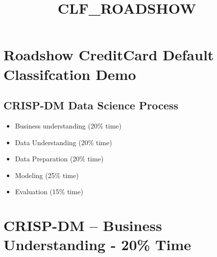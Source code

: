 \documentclass[11pt]{article}
\title{CLF\_ROADSHOW}
\providecommand{\tightlist}{%
      \setlength{\itemsep}{0pt}\setlength{\parskip}{0pt}}
\begin{document}
    
    
    \maketitle
    
    

    
    \hypertarget{roadshow-creditcard-default-classifcation-demo}{%
\section{Roadshow CreditCard Default Classifcation
Demo}\label{roadshow-creditcard-default-classifcation-demo}}

    \hypertarget{crisp-dm-data-science-process}{%
\subsection{CRISP-DM Data Science
Process}\label{crisp-dm-data-science-process}}

\begin{itemize}
\tightlist
\item
  Business understanding (20\% time)
\item
  Data Understanding (20\% time)
\item
  Data Preparation (20\% time)
\item
  Modeling (25\% time)
\item
  Evaluation (15\% time)
\end{itemize}

    \hypertarget{crisp-dm-business-understanding---20-time}{%
\section{CRISP-DM -- Business Understanding - 20\%
Time}\label{crisp-dm-business-understanding---20-time}}
\end{document}
